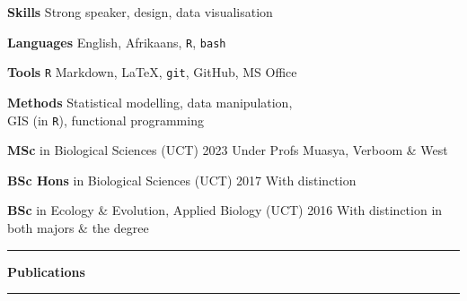 \documentclass[10pt]{article}
\begin{document}


\begin{multicols}{2} %

\textbf{Skills   }     \hfill      Strong speaker, design, data visualisation

\textbf{Languages}     \hfill   English, Afrikaans, \texttt{R}, \texttt{bash}

\textbf{Tools    }     \hfill                            \texttt{R} Markdown,
                                        {\selectfont \LaTeX},
                                              \texttt{git}, GitHub, MS Office

\textbf{Methods  }     \hfill       Statistical modelling, data manipulation, \\
                       \hfill     GIS (in \texttt{R}), functional programming

\columnbreak

\begin{hangparas}{2em}{1}

  \textbf{MSc} in Biological Sciences (UCT)                     \hfill 2023 \break
  Under Profs Muasya, Verboom \& West
  
  \textbf{BSc Hons} in Biological Sciences (UCT)                \hfill 2017 \break
  With distinction
  
  \textbf{BSc} in Ecology \& Evolution, Applied Biology (UCT)   \hfill 2016 \break
  With distinction in both majors \& the degree
  
\end{hangparas}


\end{multicols} %

\hrule

\vskip5pt

\textbf{\large Publications} %

\vskip1pt



\vskip5pt

\hrule
\end{document}

